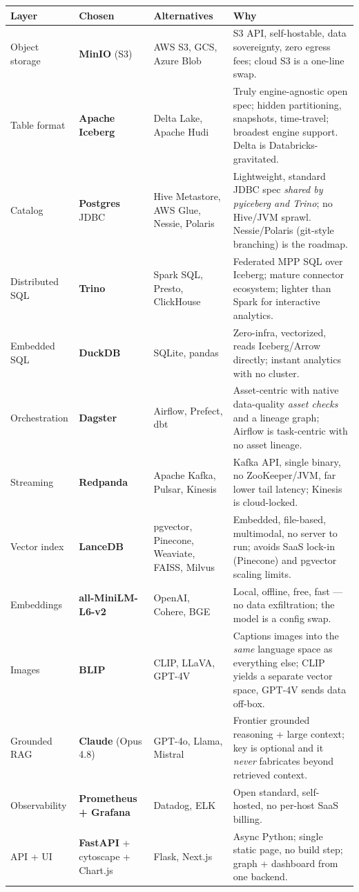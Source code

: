 \documentclass[11pt]{article}
\newcommand{\kw}[1]{\textcolor{tvaccent}{\textbf{#1}}}
\begin{document}
\renewcommand{\arraystretch}{1.3}
\begin{longtable}{>{\raggedright\arraybackslash}p{2.5cm} >{\raggedright\arraybackslash}p{2.6cm} >{\raggedright\arraybackslash}p{3.6cm} >{\raggedright\arraybackslash}p{5.2cm}}
\toprule
\textbf{Layer} & \textbf{Chosen} & \textbf{Alternatives} & \textbf{Why} \\
\midrule
\endhead
Object storage & \kw{MinIO} (S3) & AWS S3, GCS, Azure Blob & S3 API, self-hostable, data sovereignty, zero egress fees; cloud S3 is a one-line swap. \\
Table format & \kw{Apache Iceberg} & Delta Lake, Apache Hudi & Truly engine-agnostic open spec; hidden partitioning, snapshots, time-travel; broadest engine support. Delta is Databricks-gravitated. \\
Catalog & \kw{Postgres} JDBC & Hive Metastore, AWS Glue, Nessie, Polaris & Lightweight, standard JDBC spec \emph{shared by pyiceberg and Trino}; no Hive/JVM sprawl. Nessie/Polaris (git-style branching) is the roadmap. \\
Distributed SQL & \kw{Trino} & Spark SQL, Presto, ClickHouse & Federated MPP SQL over Iceberg; mature connector ecosystem; lighter than Spark for interactive analytics. \\
Embedded SQL & \kw{DuckDB} & SQLite, pandas & Zero-infra, vectorized, reads Iceberg/Arrow directly; instant analytics with no cluster. \\
Orchestration & \kw{Dagster} & Airflow, Prefect, dbt & Asset-centric with native data-quality \emph{asset checks} and a lineage graph; Airflow is task-centric with no asset lineage. \\
Streaming & \kw{Redpanda} & Apache Kafka, Pulsar, Kinesis & Kafka API, single binary, no ZooKeeper/JVM, far lower tail latency; Kinesis is cloud-locked. \\
Vector index & \kw{LanceDB} & pgvector, Pinecone, Weaviate, FAISS, Milvus & Embedded, file-based, multimodal, no server to run; avoids SaaS lock-in (Pinecone) and pgvector scaling limits. \\
Embeddings & \kw{all-MiniLM-L6-v2} & OpenAI, Cohere, BGE & Local, offline, free, fast --- no data exfiltration; the model is a config swap. \\
Images & \kw{BLIP} & CLIP, LLaVA, GPT-4V & Captions images into the \emph{same} language space as everything else; CLIP yields a separate vector space, GPT-4V sends data off-box. \\
Grounded RAG & \kw{Claude} (Opus 4.8) & GPT-4o, Llama, Mistral & Frontier grounded reasoning + large context; key is optional and it \emph{never} fabricates beyond retrieved context. \\
Observability & \kw{Prometheus + Grafana} & Datadog, ELK & Open standard, self-hosted, no per-host SaaS billing. \\
API + UI & \kw{FastAPI} + cytoscape + Chart.js & Flask, Next.js & Async Python; single static page, no build step; graph + dashboard from one backend. \\
\bottomrule
\end{longtable}
\end{document}
